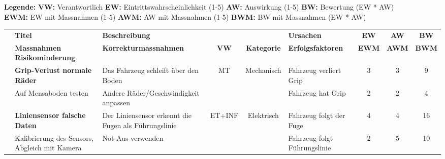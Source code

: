 \documentclass[../main.tex]{subfiles}
\begin{document}
\begin{landscape}
\newpage
\scriptsize

\textbf{Legende:}
\hspace{1cm}
\textbf{VW:} Verantwortlich
\hspace{1cm}
\textbf{EW:} Eintrittswahrscheinlichkeit (1-5)
\hspace{1cm}
\textbf{AW:} Auswirkung (1-5)
\hspace{1cm}
\textbf{BW:} Bewertung (EW * AW)
\\
\vspace{1mm} \hspace{21.5mm}
\textbf{EWM:} EW mit Massnahmen (1-5)
\hspace{1cm}
\textbf{AWM:} AW mit Massnahmen  (1-5)
\hspace{1cm}
\textbf{BWM:} BW mit Massnahmen (EW * AW)


\renewcommand{\arraystretch}{1.5} %
\setlength{\arrayrulewidth}{0.6pt}
\begin{longtable}
{|c|p{4.5cm}|p{5cm}|c|c|p{4.5cm}|c|c|c|}
\hline
\rowcolor{white}
& \textbf{Titel} & \textbf{Beschreibung} & & & \textbf{Ursachen} & \textbf{EW} & \textbf{AW} & \textbf{BW} \\ 
\cline{2-3} \cline{6-9}
\rowcolor{white}
\multirow{-2}{*}{\textbf{ID}}
& \textbf{Massnahmen Risikominderung} & \textbf{Korrekturmassnahmen} & \multirow{-2}{*}{\textbf{VW}} & \multirow{-2}{*}{\textbf{Kategorie}} & \textbf{Erfolgsfaktoren} & \textbf{EWM} & \textbf{AWM} & \textbf{BWM} \\ \hline
\endhead

\rowcolor[HTML]{F5F5F5} & \textbf{Grip-Verlust normale Räder} & Das Fahrzeug schleift über den Boden & MT & Mechanisch & Fahrzeug verliert Grip & 3 & 3 & \cellcolor[HTML]{FFFF66}9
\\* \cline{2-3} \cline{6-9}
\rowcolor[HTML]{F5F5F5} \multirow{-2}{*}{\hypertarget{R1}{R1}} & Auf Mensaboden testen & Andere Räder/Geschwindigkeit anpassen & & & Fahrzeug hat Grip & 2 & 2 & \cellcolor[HTML]{CCFF33}4 \\ \hline

\rowcolor{white} & \textbf{Liniensensor falsche Daten} & Der Liniensensor erkennt die Fugen als Führungslinie & ET+INF & Elektrisch & Fahrzeug folgt der Fuge & 4 & 4 & \cellcolor[HTML]{FFC000}16
\\* \cline{2-3} \cline{6-9}
\rowcolor{white} \multirow{-2}{*}{\hypertarget{R2}{R2}} & Kalibrierung des Sensors, Abgleich mit Kamera & Not-Aus verwenden & & & Fahrzeug folgt Führungslinie & 2 & 5 & \cellcolor[HTML]{FFC000}10 \\ \hline


\end{longtable}
\end{landscape}
\end{document}
